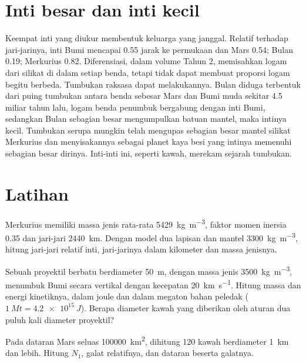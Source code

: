 \section{Inti besar dan inti kecil}\label{sec:b3:planetary-interiors-surfaces:cores}

Keempat inti yang diukur membentuk keluarga yang janggal. Relatif terhadap jari-jarinya, inti
Bumi mencapai 0.55 jarak ke permukaan dan Mars 0.54;
Bulan 0.19; Merkurius 0.82. Diferensiasi, dalam volume Tahun 2, memisahkan
logam dari silikat di dalam setiap benda, tetapi tidak dapat membuat proporsi
logam begitu berbeda. Tumbukan raksasa dapat melakukannya. Bulan diduga terbentuk
dari puing tumbukan antara benda sebesar Mars dan
Bumi muda sekitar 4.5 miliar tahun lalu, logam benda penumbuk bergabung dengan
inti Bumi, sedangkan Bulan sebagian besar mengumpulkan batuan mantel, maka intinya
kecil. Tumbukan serupa mungkin telah mengupas sebagian besar mantel silikat
Merkurius dan menyisakannya sebagai planet kaya besi yang intinya memenuhi sebagian besar
dirinya. Inti-inti ini, seperti kawah, merekam sejarah tumbukan.

\section{Latihan}

\begin{exercise}[$\star$]\label{exo:b3:planetary-interiors-surfaces:1}
Merkurius memiliki massa jenis rata-rata \qty{5429}{kg.m^{-3}}, faktor momen
inersia 0.35 dan jari-jari \qty{2440}{km}. Dengan model dua lapisan dan
mantel \qty{3300}{kg.m^{-3}}, hitung jari-jari relatif inti,
jari-jarinya dalam kilometer dan massa jenisnya.
\end{exercise}

\begin{exercise}[$\star$]\label{exo:b3:planetary-interiors-surfaces:2}
Sebuah proyektil berbatu berdiameter \qty{50}{m}, dengan massa jenis \qty{3500}{kg.m^{-3}},
menumbuk Bumi secara vertikal dengan kecepatan \qty{20}{km.s^{-1}}. Hitung massa dan
energi kinetiknya, dalam joule dan dalam megaton bahan peledak
($\qty{1}{Mt} = \qty{4.2e15}{J}$). Berapa diameter kawah yang diberikan oleh aturan
dua puluh kali diameter proyektil?
\end{exercise}

\begin{exercise}[$\star$]\label{exo:b3:planetary-interiors-surfaces:3}
Pada dataran Mars seluas \qty{100000}{km^2}, dihitung 120 kawah berdiameter \qty{1}{km} dan
lebih. Hitung $N_1$, galat relatifnya, dan 
dataran beserta galatnya.
\end{exercise}

